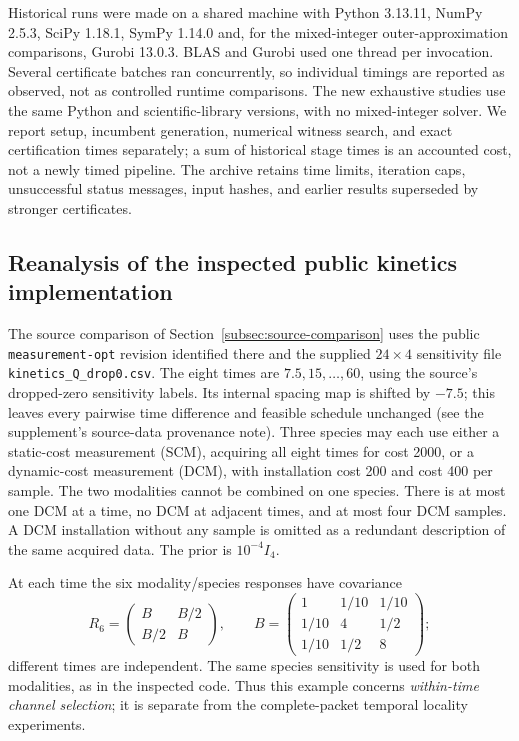 Historical runs were made on a shared machine with Python 3.13.11,
NumPy 2.5.3, SciPy 1.18.1, SymPy 1.14.0 and, for the mixed-integer
outer-approximation comparisons, Gurobi 13.0.3. BLAS and Gurobi used one thread
per invocation. Several certificate batches ran concurrently, so individual
timings are reported as observed, not as controlled runtime comparisons. The
new exhaustive studies use the same Python and scientific-library versions,
with no mixed-integer solver. We report setup, incumbent generation, numerical
witness search, and exact certification times separately; a sum of historical
stage times is an accounted cost, not a newly timed pipeline. The archive
retains time limits, iteration caps, unsuccessful status messages, input
hashes, and earlier results superseded by stronger certificates.

\subsection{Reanalysis of the inspected public kinetics implementation}
\label{subsec:source-computation}

The source comparison of Section~\ref{subsec:source-comparison} uses the public
\texttt{measurement-opt} revision identified there and the supplied
$24\times4$ sensitivity file \texttt{kinetics\_Q\_drop0.csv}.
The eight times are $7.5,15,\ldots,60$, using the source's dropped-zero
sensitivity labels. Its internal spacing map is shifted by $-7.5$; this
leaves every pairwise time difference and feasible schedule unchanged
(see the supplement's source-data provenance note).
Three species may each use either a
static-cost measurement (SCM), acquiring all eight times for cost 2000,
or a dynamic-cost measurement (DCM), with installation cost 200 and cost 400 per
sample. The two modalities cannot be combined on one species. There is at
most one DCM at a time, no DCM at adjacent times, and at most four DCM samples.
A DCM installation without any sample is omitted as a redundant description
of the same acquired data. The prior is $10^{-4}I_4$.

At each time the six modality/species responses have covariance
\[
 R_6=\begin{pmatrix}B&B/2\\B/2&B\end{pmatrix},\qquad
 B=\begin{pmatrix}1&1/10&1/10\\1/10&4&1/2\\1/10&1/2&8\end{pmatrix};
\]
different times are independent. The same species sensitivity is used for
both modalities, as in the inspected code. Thus this example concerns
\emph{within-time channel selection}; it is separate from the complete-packet
temporal locality experiments.

